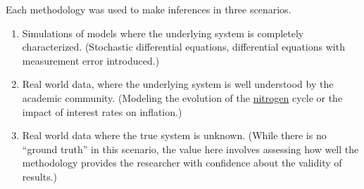 \documentclass{article}
\begin{document}
Each methodology was used to make inferences in three scenarios.
\begin{enumerate}
    \item Simulations of models where the underlying system is completely characterized. 
    (Stochastic differential equations, differential equations with measurement error introduced.)
    \item Real world data, where the underlying system is well understood by the academic community.
    (Modeling the evolution of the \href{https://www.sciencedirect.com/science/article/pii/S0045653520316866}{nitrogen}
    cycle or the impact of interest rates on inflation.)
    \item Real world data where the true system is unknown. (While there is no ``ground truth''
    in this scenario, the value here involves assessing how well the methodology provides the
    researcher with confidence about the validity of results.)
\end{enumerate}



\end{document}
